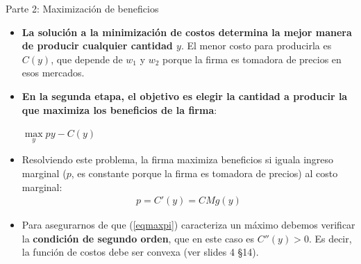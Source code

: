 \documentclass{beamer}
\theoremstyle{definition}
\begin{document}
\begin{frame}{Parte 2: Maximización de beneficios}\small
\begin{itemize}
\item \textbf{La soluci\'{o}n a la minimizaci\'{o}n de costos determina la mejor
manera de producir cualquier cantidad $y$}. El menor costo para producirla es $C(y)$, que depende de $w_1$ y $w_2$ porque la firma es tomadora de precios en esos mercados.
\item \textbf{En la segunda etapa, el objetivo es elegir la cantidad a producir la que maximiza los
beneficios de la firma}:
\begin{center}
$\max\limits_{y}py-C(y)$
\end{center}
\item Resolviendo este problema, la firma maximiza beneficios si iguala ingreso marginal ($p$, es constante porque la firma es tomadora de precios) al costo marginal:
\begin{align}
p=C'(y)=CMg(y) \label{eqmaxpi}
\end{align}
\item Para asegurarnos de que (\ref{eqmaxpi}) caracteriza un m\'{a}ximo debemos
verificar la \textbf{condici\'{o}n de segundo orden}, que en este caso es $C''(y)>0$. Es decir, la funci\'{o}n de costos debe ser convexa (ver slides 4 \S14).
\end{itemize}
\end{frame}
\end{document}
